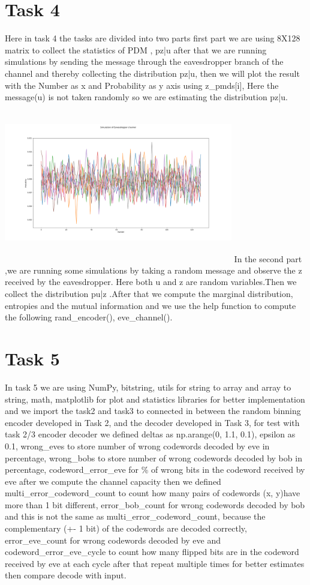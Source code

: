 \documentclass{report}
\begin{document}
\section*{Task 4}
Here in task 4 the tasks are divided into two parts first part we are using 8X128 matrix to collect the statistics of PDM , pz|u after that we are running simulations by sending the message through the eavesdropper branch of the channel and thereby collecting the distribution  pz|u, then we will plot the result with the Number as x and Probability as y axis using z\_pmds[i], Here the message(u) is not taken randomly so we are estimating the distribution pz|u. \hfill \break \linebreak
 \includegraphics[width=10cm,height=7cm]{3}  \hfill \break \linebreak
In the second part ,we are running some simulations  by taking a random message and observe the  z received by the eavesdropper. Here both u and z are random variables.Then we collect the distribution pu|z .After that we compute the marginal distribution, entropies and the mutual information and we use the help function to compute the following rand\_encoder(), eve\_channel().
\section*{Task 5}
In task 5 we are using NumPy, bitstring, utils for string to array and array to string, math, matplotlib for plot and statistics libraries for better implementation and we import the task2 and task3 to connected in between the random binning encoder developed in Task 2, and the decoder
developed in Task 3, for test with task 2/3 encoder decoder we defined deltas as np.arange(0, 1.1, 0.1), epsilon  as 0.1, wrong\_eves to store number of wrong codewords decoded by eve in percentage, wrong\_bobs to store number of wrong codewords decoded by bob in percentage, codeword\_error\_eve for \% of wrong bits in the codeword received by eve after we compute the channel capacity then we defined     multi\_error\_codeword\_count to count how many pairs of codewords (x, y)have more than 1 bit different, error\_bob\_count for wrong codewords decoded by bob and this is not the same as multi\_error\_codeword\_count, because the complementary (+- 1 bit) of the codewords are decoded correctly, error\_eve\_count for wrong codewords decoded by eve and codeword\_error\_eve\_cycle to count how many flipped bits are in the codeword received by eve at each cycle after that repeat multiple times for better estimates then compare decode with input.
\end{document}
